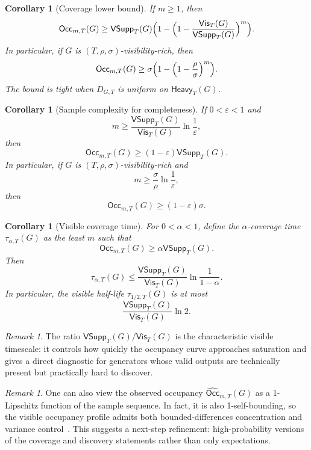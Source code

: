 \documentclass[11pt]{article}
\newtheorem{corollary}[definition]{Corollary}
\theoremstyle{remark}
\newtheorem{remark}[definition]{Remark}
\theoremstyle{definition}
\begin{document}
\begin{corollary}[Coverage lower bound]\label{cor:coverage-lb}
If $m \ge 1$, then
\[
\mathsf{Occ}_{m,T}(G) \ge \mathsf{VSupp}_T(G)\Bigl(1 - \Bigl(1 - \frac{\mathsf{Vis}_T(G)}{\mathsf{VSupp}_T(G)}\Bigr)^m\Bigr).
\]
In particular, if $G$ is $(T,\rho,\sigma)$-visibility-rich, then
\[
\mathsf{Occ}_{m,T}(G) \ge \sigma\Bigl(1 - \Bigl(1 - \frac{\rho}{\sigma}\Bigr)^m\Bigr).
\]
The bound is tight when $D_{G,T}$ is uniform on $\mathsf{Heavy}_T(G)$.
\end{corollary}

\begin{corollary}[Sample complexity for completeness]
If $0 < \varepsilon < 1$ and
\[
 m \ge \frac{\mathsf{VSupp}_T(G)}{\mathsf{Vis}_T(G)}\ln\frac{1}{\varepsilon},
\]
then
\[
\mathsf{Occ}_{m,T}(G) \ge (1-\varepsilon)\mathsf{VSupp}_T(G).
\]
In particular, if $G$ is $(T,\rho,\sigma)$-visibility-rich and
\[
 m \ge \frac{\sigma}{\rho}\ln\frac{1}{\varepsilon},
\]
then
\[
\mathsf{Occ}_{m,T}(G) \ge (1-\varepsilon)\sigma.
\]
\end{corollary}

\begin{corollary}[Visible coverage time]
For $0 < \alpha < 1$, define the $\alpha$-coverage time $\tau_{\alpha,T}(G)$ as the least $m$ such that
\[
\mathsf{Occ}_{m,T}(G) \ge \alpha\mathsf{VSupp}_T(G).
\]
Then
\[
\tau_{\alpha,T}(G) \le \frac{\mathsf{VSupp}_T(G)}{\mathsf{Vis}_T(G)}\ln\frac{1}{1-\alpha}.
\]
In particular, the visible half-life $\tau_{1/2,T}(G)$ is at most
\[
\frac{\mathsf{VSupp}_T(G)}{\mathsf{Vis}_T(G)}\ln 2.
\]
\end{corollary}

\begin{remark}
The ratio $\mathsf{VSupp}_T(G)/\mathsf{Vis}_T(G)$ is the characteristic visible timescale: it controls how quickly the occupancy curve approaches saturation and gives a direct diagnostic for generators whose valid outputs are technically present but practically hard to discover.
\end{remark}

\begin{remark}
One can also view the observed occupancy $\widehat{\mathsf{Occ}}_{m,T}(G)$ as a 1-Lipschitz function of the sample sequence. In fact, it is also 1-self-bounding, so the visible occupancy profile admits both bounded-differences concentration and variance control~\cite{McDiarmid1989,Warnke2016,BoucheronLugosiMassart2009,McDiarmidReed2006}. This suggests a next-step refinement: high-probability versions of the coverage and discovery statements rather than only expectations.
\end{remark}
\end{document}
